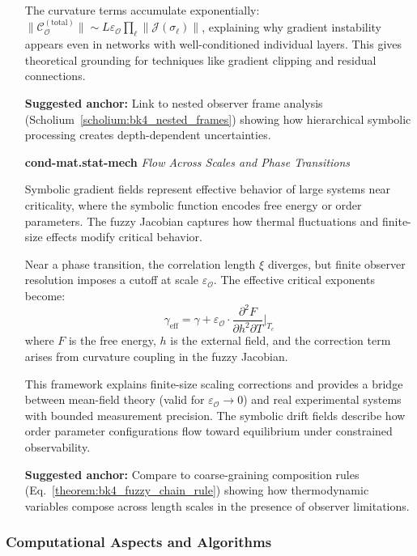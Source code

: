 \begin{itemize}
  The curvature terms accumulate exponentially: $\|\mathcal{C}_{\mathcal{O}}^{(\text{total})}\| \sim L \varepsilon_{\mathcal{O}} \prod_\ell \|\mathcal{J}(\sigma_\ell)\|$, explaining why gradient instability appears even in networks with well-conditioned individual layers. This gives theoretical grounding for techniques like gradient clipping and residual connections.
  
  \textbf{Suggested anchor:} Link to nested observer frame analysis (Scholium~\ref{scholium:bk4_nested_frames}) showing how hierarchical symbolic processing creates depth-dependent uncertainties.

  \item[\textbf{cond-mat.stat-mech}] \textit{Flow Across Scales and Phase Transitions}  
  
  Symbolic gradient fields represent effective behavior of large systems near criticality, where the symbolic function encodes free energy or order parameters. The fuzzy Jacobian captures how thermal fluctuations and finite-size effects modify critical behavior.
  
  Near a phase transition, the correlation length $\xi$ diverges, but finite observer resolution imposes a cutoff at scale $\varepsilon_{\mathcal{O}}$. The effective critical exponents become:
  \[
  \gamma_{\text{eff}} = \gamma + \varepsilon_{\mathcal{O}} \cdot \frac{\partial^2 F}{\partial h^2 \partial T}\bigg|_{T_c}
  \]
  where $F$ is the free energy, $h$ is the external field, and the correction term arises from curvature coupling in the fuzzy Jacobian.
  
  This framework explains finite-size scaling corrections and provides a bridge between mean-field theory (valid for $\varepsilon_{\mathcal{O}} \to 0$) and real experimental systems with bounded measurement precision. The symbolic drift fields describe how order parameter configurations flow toward equilibrium under constrained observability.
  
  \textbf{Suggested anchor:} Compare to coarse-graining composition rules (Eq.~\ref{theorem:bk4_fuzzy_chain_rule}) showing how thermodynamic variables compose across length scales in the presence of observer limitations.

\end{itemize}


\subsubsection{Computational Aspects and Algorithms}
\label{subsubsec:bk4_computational_aspects_algorithms}

